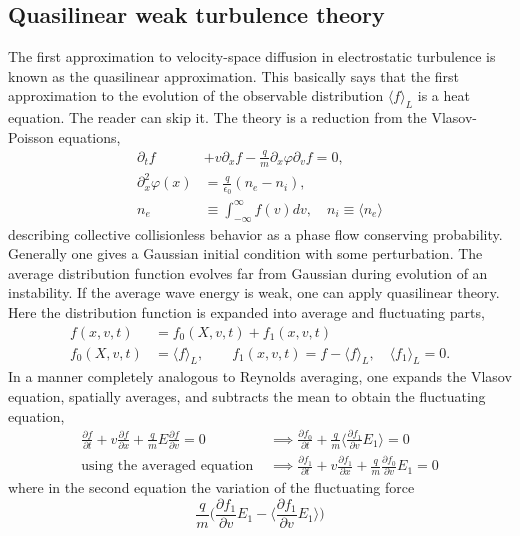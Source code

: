 \documentclass{article}
\begin{document}
\subsection{Quasilinear weak turbulence theory}
The first approximation to velocity-space diffusion in electrostatic turbulence is known as the quasilinear approximation. This basically says that the first approximation to the evolution of the observable distribution $\langle f\rangle_L$ is a heat equation. The reader can skip it. The theory is a reduction from the Vlasov-Poisson equations,
\begin{align}
  \partial_tf &+ v\partial_xf - \frac{q}{m}\partial_x\varphi\partial_vf = 0,\label{vlasov}\\
  \partial_x^2\varphi(x) &= \frac{q}{\epsilon_0}(n_e - n_i),\label{poisson}\\
  n_e &\equiv \int_{-\infty}^\infty f(v)dv, \quad n_i \equiv \langle n_e\rangle
\end{align}
describing collective collisionless behavior as a phase flow conserving probability. Generally one gives a Gaussian initial condition with some perturbation. The average distribution function evolves far from Gaussian during evolution of an instability. If the average wave energy is weak, one can apply quasilinear theory. Here the distribution function is expanded into average and fluctuating parts,
\begin{align}
  f(x,v,t) &= f_0(X, v, t) + f_1(x, v, t)\\
  f_0(X,v,t) &= \langle f\rangle_L,\quad\quad f_1(x,v,t) = f-\langle f\rangle_L,\quad \langle f_1\rangle_L = 0.
\end{align}
In a manner completely analogous to Reynolds averaging, one expands the Vlasov equation, spatially averages, and subtracts the mean to obtain the fluctuating equation,
\begin{align}
  \frac{\partial f}{\partial t} + v\frac{\partial f}{\partial x} + \frac{q}{m}E\frac{\partial f}{\partial v} = 0&\implies \frac{\partial f_0}{\partial t} + \frac{q}{m}\Big\langle\frac{\partial f_1}{\partial v}E_1\Big\rangle = 0\\
  \text{using the averaged equation } &\implies \frac{\partial f_1}{\partial t} + v\frac{\partial f_1}{\partial x} + \frac{q}{m}\frac{\partial f_0}{\partial v}E_1 = 0
\end{align}
where in the second equation the variation of the fluctuating force
\begin{equation}
  \frac{q}{m}\Big(\frac{\partial f_1}{\partial v}E_1 - \Big\langle\frac{\partial f_1}{\partial v}E_1\Big\rangle\Big)\label{dropped}
\end{equation}
\end{document}
